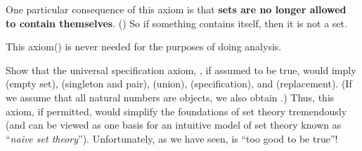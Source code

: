 \begin{note}
One particular consequence of this axiom is that \textbf{sets are no longer allowed to contain themselves}. () So if something contains itself, then it is not a set.
\end{note}

\begin{note}
This axiom() is never needed for the purposes of doing analysis.
\end{note}

\exercisesection

\begin{exercise} \label{exercise 3.2.1}
Show that the universal specification axiom, , if assumed to be true, would imply  (empty set),  (singleton and pair),  (union),  (specification), and  (replacement). (If we assume that all natural numbers are objects, we also obtain .) Thus, this axiom, if permitted, would simplify the foundations of set theory tremendously (and can be viewed as one basis for an intuitive model of set theory known as ``\emph{naive set theory}''). Unfortunately, as we have seen,  is ``too good to be true''!
\end{exercise}

